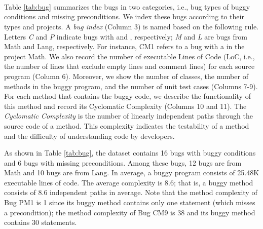 \begin{table*}[!t]
{\begin{tabular}{|c|c|ccc|c|c|c|c|lc|}
\end{tabular}
}
\\
\ 

 \\

\end{table*}

Table \ref{tab:bug} summarizes the \numbug bugs in two categories, i.e., bug types of buggy \ourif conditions and missing preconditions. We index these bugs according to their types and projects. A \textit{bug index} (Column 3) is named based on the following rule. Letters \textit{C} and \textit{P} indicate bugs with \buggyconditions and \preconditions, respectively; \textit{M} and \textit{L} are bugs from Math and Lang, respectively. For instance, CM1 refers to a bug with a \buggycondition in the project Math. We also record the number of executable Lines of Code (LoC, i.e., the number of lines that exclude empty lines and comment lines) for each source program (Column 6). 
Moreover, we show the number of classes, the number of methods in the buggy program, and the number of unit test cases (Columns 7-9). 
For each method that contains the buggy code, we describe the functionality of this method and record its Cyclomatic Complexity (Columns 10 and 11). 
The \textit{Cyclomatic Complexity} \cite{mccabe1976complexity} is the number of linearly independent paths through the source code of a method. This complexity indicates the testability of a method and the difficulty of understanding code by developers. 

As shown in Table \ref{tab:bug}, the dataset contains 16 bugs with buggy \ourif conditions and 6 bugs with missing preconditions. Among these bugs, 12 bugs are from Math and 10 bugs are from Lang. In average, a buggy program consists of 25.48K executable lines of code. The average complexity is 8.6; that is, a buggy method consists of 8.6 independent paths in average. Note that the method complexity of Bug PM1 is 1 since its buggy method contains only one  statement (which misses a precondition); the method complexity of Bug CM9 is 38 and its buggy method contains 30 \ourif statements.   

